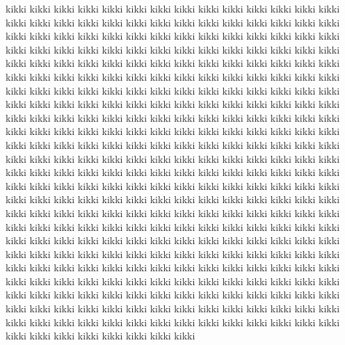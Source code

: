 \documentclass[a4paper,12pt,oneside]{lauluvihko}
\begin{document}
\begin{multicols}{2}
kikki kikki kikki kikki kikki kikki kikki kikki kikki kikki kikki kikki kikki kikki kikki kikki kikki kikki kikki kikki kikki kikki kikki kikki kikki kikki kikki kikki kikki kikki kikki kikki kikki kikki kikki kikki kikki kikki kikki kikki kikki kikki kikki kikki kikki kikki kikki kikki kikki kikki kikki kikki kikki kikki kikki kikki kikki kikki kikki kikki kikki kikki kikki kikki kikki kikki kikki kikki kikki kikki kikki kikki kikki kikki kikki kikki kikki kikki kikki kikki kikki kikki kikki kikki kikki kikki kikki kikki kikki kikki kikki kikki kikki kikki kikki kikki kikki kikki kikki kikki kikki kikki kikki kikki kikki kikki kikki kikki kikki kikki kikki kikki kikki kikki kikki kikki kikki kikki kikki kikki kikki kikki kikki kikki kikki kikki kikki kikki kikki kikki kikki kikki kikki kikki kikki kikki kikki kikki kikki kikki kikki kikki kikki kikki kikki kikki kikki kikki kikki kikki kikki kikki kikki kikki kikki kikki kikki kikki kikki kikki kikki kikki kikki kikki kikki kikki kikki kikki kikki kikki kikki kikki kikki kikki kikki kikki kikki kikki kikki kikki kikki kikki kikki kikki kikki kikki kikki kikki kikki kikki kikki kikki kikki kikki kikki kikki kikki kikki kikki kikki kikki kikki kikki kikki kikki kikki kikki kikki kikki kikki kikki kikki kikki kikki kikki kikki kikki kikki kikki kikki kikki kikki kikki kikki kikki kikki kikki kikki kikki kikki kikki kikki kikki kikki kikki kikki kikki kikki kikki kikki kikki kikki kikki kikki kikki kikki kikki kikki kikki kikki kikki kikki kikki kikki kikki kikki kikki kikki kikki kikki kikki kikki kikki kikki kikki kikki kikki kikki kikki kikki kikki kikki kikki kikki kikki kikki kikki kikki kikki kikki kikki kikki kikki kikki kikki kikki kikki kikki kikki kikki kikki kikki kikki kikki kikki kikki kikki kikki kikki kikki kikki kikki kikki kikki kikki kikki kikki kikki kikki kikki kikki kikki kikki kikki kikki kikki kikki kikki kikki kikki kikki kikki kikki kikki kikki kikki kikki kikki kikki kikki kikki kikki kikki kikki kikki kikki kikki kikki kikki kikki kikki kikki kikki kikki 
\end{multicols}
\end{document}

